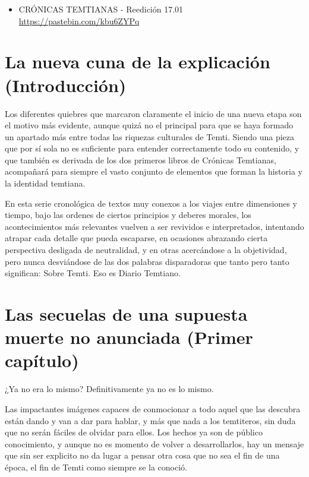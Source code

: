 \documentclass[
  spanish,
]{book}
\providecommand{\tightlist}{%
  \setlength{\itemsep}{0pt}\setlength{\parskip}{0pt}}
\begin{document}
\begin{itemize}
\tightlist
\item
  CRÓNICAS TEMTIANAS - Reedición 17.01 \url{https://pastebin.com/kbu6ZYPq}
\end{itemize}

\hypertarget{la-nueva-cuna-de-la-explicaciuxf3n-introducciuxf3n}{%
\chapter{La nueva cuna de la explicación (Introducción)}\label{la-nueva-cuna-de-la-explicaciuxf3n-introducciuxf3n}}

Los diferentes quiebres que marcaron claramente el inicio de una nueva etapa son el motivo más evidente, aunque quizá no el principal para que se haya formado un apartado más entre todas las riquezas culturales de Temti. Siendo una pieza que por sí sola no es suficiente para entender correctamente todo su contenido, y que también es derivada de los dos primeros libros de Crónicas Temtianas, acompañará para siempre el vasto conjunto de elementos que forman la historia y la identidad temtiana.

En esta serie cronológica de textos muy conexos a los viajes entre dimensiones y tiempo, bajo las ordenes de ciertos principios y deberes morales, los acontecimientos más relevantes vuelven a ser revividos e interpretados, intentando atrapar cada detalle que pueda escaparse, en ocasiones abrazando cierta perspectiva desligada de neutralidad, y en otras acercándose a la objetividad, pero nunca desviándose de las dos palabras disparadoras que tanto pero tanto significan: Sobre Temti. Eso es Diario Temtiano.

\hypertarget{las-secuelas-de-una-supuesta-muerte-no-anunciada-primer-capuxedtulo}{%
\chapter{Las secuelas de una supuesta muerte no anunciada (Primer capítulo)}\label{las-secuelas-de-una-supuesta-muerte-no-anunciada-primer-capuxedtulo}}

¿Ya no era lo mismo? Definitivamente ya no es lo mismo.

Las impactantes imágenes capaces de conmocionar a todo aquel que las descubra están dando y van a dar para hablar, y más que nada a los temtiteros, sin duda que no serán fáciles de olvidar para ellos. Los hechos ya son de público conocimiento, y aunque no es momento de volver a desarrollarlos, hay un mensaje que sin ser explicito no da lugar a pensar otra cosa que no sea el fin de una época, el fin de Temti como siempre se la conoció.
\end{document}
